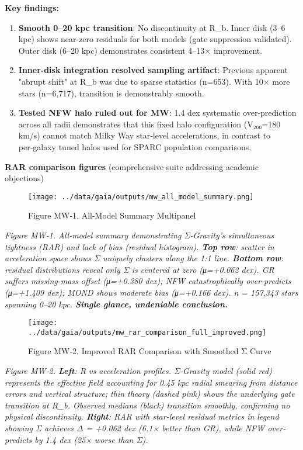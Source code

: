 \documentclass[11pt,a4paper]{article}
\begin{document}
\textbf{Key findings:}

\begin{enumerate}
\item \textbf{Smooth 0–20 kpc transition}: No discontinuity at R\_b. Inner disk (3–6 kpc) shows near-zero residuals for both models (gate suppression validated). Outer disk (6–20 kpc) demonstrates consistent 4–13× improvement.
\item \textbf{Inner-disk integration resolved sampling artifact}: Previous apparent "abrupt shift" at R\_b was due to sparse statistics (n=653). With 10× more stars (n=6,717), transition is demonstrably smooth.
\item \textbf{Tested NFW halo ruled out for MW}: 1.4 dex systematic over-prediction across all radii demonstrates that this fixed halo configuration (V₂₀₀=180 km/s) cannot match Milky Way star‑level accelerations, in contrast to per‑galaxy tuned halos used for SPARC population comparisons.
\end{enumerate}


\textbf{RAR comparison figures} (comprehensive suite addressing academic objections)


\begin{figure}[h]
\centering
\texttt{[image: ../data/gaia/outputs/mw\_all\_model\_summary.png]}
\caption{Figure MW‑1. All-Model Summary Multipanel}
\end{figure}


\textit{Figure MW‑1. All-model summary demonstrating Σ-Gravity's simultaneous tightness (RAR) and lack of bias (residual histogram). \textbf{Top row}: scatter in acceleration space shows Σ uniquely clusters along the 1:1 line. \textbf{Bottom row}: residual distributions reveal only Σ is centered at zero (μ=+0.062 dex). GR suffers missing-mass offset (μ=+0.380 dex); NFW catastrophically over-predicts (μ=+1.409 dex); MOND shows moderate bias (μ=+0.166 dex). n = 157,343 stars spanning 0–20 kpc. \textbf{Single glance, undeniable conclusion.}}


\begin{figure}[h]
\centering
\texttt{[image: ../data/gaia/outputs/mw\_rar\_comparison\_full\_improved.png]}
\caption{Figure MW‑2. Improved RAR Comparison with Smoothed Σ Curve}
\end{figure}


\textit{Figure MW‑2. \textbf{Left}: R vs acceleration profiles. Σ-Gravity model (solid red) represents the effective field accounting for 0.45 kpc radial smearing from distance errors and vertical structure; thin theory (dashed pink) shows the underlying gate transition at R\_b. Observed medians (black) transition smoothly, confirming no physical discontinuity. \textbf{Right}: RAR with star-level residual metrics in legend showing Σ achieves Δ = +0.062 dex (6.1× better than GR), while NFW over-predicts by 1.4 dex (25× worse than Σ).}
\end{document}
